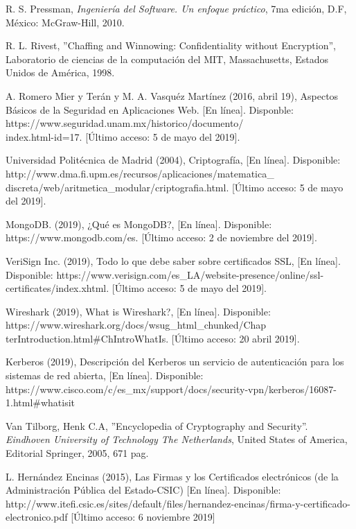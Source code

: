 \documentclass[12pt, a4paper, titlepage]{report}
\begin{document}
\begin{thebibliography}{20}
		R. S. Pressman, \textit{Ingeniería del Software. Un enfoque práctico}, 7ma edición, D.F, México: McGraw-Hill, 2010.
		
		R. L. Rivest, ''Chaffing and Winnowing: Confidentiality without Encryption'', Laboratorio de ciencias de la computación del MIT, Massachusetts, Estados Unidos de América, 1998.
		
		A. Romero Mier y Terán y M. A. Vasquéz Martínez (2016, abril 19), Aspectos Básicos de la Seguridad en Aplicaciones Web. [En línea]. Disponble: https://www.seguridad.unam.mx/historico/documento/\\index.html-id=17. [Último acceso: 5 de mayo del 2019].
        
	    Universidad Politécnica de Madrid (2004), Criptografía, [En línea]. Disponible: http://www.dma.fi.upm.es/recursos/aplicaciones/matematica\_ discreta/web/aritmetica\_modular/criptografia.html. [Último acceso: 5 de mayo del 2019].
	    
	    MongoDB. (2019), ¿Qué es MongoDB?, [En línea]. Disponible: https://www.mongodb.com/es. [Último acceso: 2 de noviembre del 2019].
	    
        VeriSign Inc. (2019), Todo lo que debe saber sobre certificados SSL, [En línea]. Disponible: https://www.verisign.com/es\_LA/website-presence/online/ssl-certificates/index.xhtml. [Último acceso: 5 de mayo del 2019].
        
        Wireshark (2019), What is Wireshark?, [En línea]. Disponible: https://www.wireshark.org/docs/wsug\_html\_chunked/Chap\\terIntroduction.html\#ChIntroWhatIs. [Último acceso: 20 abril 2019].
        
        Kerberos (2019), Descripción del Kerberos un servicio de autenticación para los sistemas de red abierta, [En línea]. Disponible: https://www.cisco.com/c/es\_mx/support/docs/security-vpn/kerberos/16087-1.html\#whatisit
        
        Van Tilborg, Henk C.A, ''Encyclopedia of Cryptography and Security''. \textit{Eindhoven University of Technology The Netherlands}, United States of America, Editorial Springer, 2005, 671 pag. 
        
        L. Hernández Encinas (2015), Las Firmas y los Certificados electrónicos (de la Administración Pública del Estado-CSIC) [En línea]. Disponible: http://www.itefi.csic.es/sites/default/files/hernandez-encinas/firma-y-certificado-electronico.pdf [Último acceso: 6 noviembre 2019]
        

\end{thebibliography}
\end{document}
